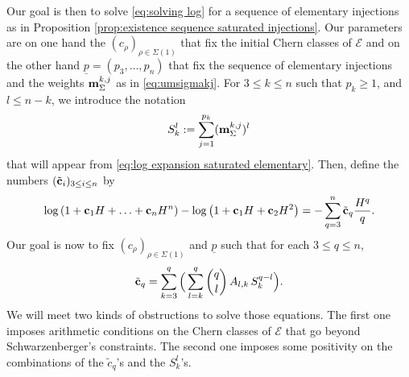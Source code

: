 \documentclass[a4paper,10pt]{amsart}
\theoremstyle{plain}{
    \newtheorem{theorem}{Theorem}[section]
    \newtheorem{lemma}[theorem]{Lemma}
    \newtheorem{corollary}[theorem]{Corollary}
    \newtheorem{proposition}[theorem]{Proposition}
    \newtheorem{conjecture}[theorem]{Conjecture}
}
\theoremstyle{definition}{
    \newtheorem{definition}[theorem]{Definition}
    \newtheorem{defn-thm}[theorem]{Definition-Theorem}
    \newtheorem{example}[theorem]{Example}
    \newtheorem{notation}[theorem]{Notation}
}
\theoremstyle{remark}{
    \newtheorem{remark}[theorem]{Remark}
    \newtheorem{problem}[theorem]{Problem}
    \newtheorem{question}[theorem]{Question}
}
\def\um{{\bf m}}
\def\uc{{\bf c}}
\def\cE{\mathcal{E}}
\def\up{\underline{p}}
\begin{document}
Our goal is then to solve \eqref{eq:solving log} for a sequence of elementary injections as in Proposition \ref{prop:existence sequence saturated injections}. Our parameters are on one hand the $(c_\rho)_{\rho\in\Sigma(1)}$ that fix the initial Chern classes of $\cE$ and on the other hand $\up=(p_3,\ldots,p_n)$ that fix the sequence of elementary injections and the weights $\um_\Sigma^{k,j}$ as in \eqref{eq:umsigmakj}. For $3\leq k\leq n$ such that $p_k\geq 1$, and $l\leq n-k$, we introduce the notation
\begin{equation}
 \label{eq:Skl}
S_k^l:=\sum_{j=1}^{p_k} (\um_\Sigma^{k,j})^l 
\end{equation}
that will appear from \eqref{eq:log expansion saturated elementary}. Then, define the numbers $(\tilde \uc_i)_{3\leq i \leq n}$ by
\begin{equation}
 \label{eq:chern ratio expansion}
 \log\left(1+\uc_1 H+\ldots+ \uc_nH^n\right)-\log\left(1+\uc_1 H+\uc_2 H^2\right)=-\sum_{q=3}^n \tilde\uc_q \frac{H^q}{q}.
\end{equation}
Our goal is now to fix $(c_\rho)_{\rho\in\Sigma(1)}$ and $\up$ such that for each $3\leq q\leq n$,
\begin{equation}
 \label{eq:general kth equation}
 \tilde \uc_q =\sum_{k=3}^q\Big(\sum_{l=k}^q \binom{q}{l}\, A_{l,k}\, S_k^{q-l} \Big).
\end{equation}
We will meet two kinds of obstructions to solve those equations. The first one imposes arithmetic conditions on the Chern classes of $\cE$ that go beyond Schwarzenberger's constraints. The second one imposes some positivity on the combinations of the $\tilde c_q$'s and the $S_k^l$'s.
\end{document}
